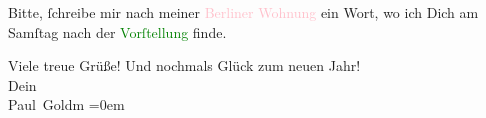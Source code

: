 \pstart
           Bitte, ſchreibe mir nach meiner \textcolor{pink}{Berliner Wohnung}{}\ledrightnote{{$\rightarrow$}\textcolor{pink}{Dessauer Straße}} ein Wort, wo ich Dich am Samſtag nach der 
               \textcolor{green}{Vorſtellung}{}\ledrightnote{{$\rightarrow$}\textcolor{green}{Lebendige Stunden. Vier Einakter}}
                finde.\pend
           
\pstart
           Viele treue Grüße! Und nochmals Glück zum neuen Jahr!
               {\\[\baselineskip]}Dein {\\[\baselineskip]}\spacefill\mbox{Paul Goldm}\pend
           \leftskip=0em{}\endnumbering{}
\begin{anhang}
\end{anhang}
      